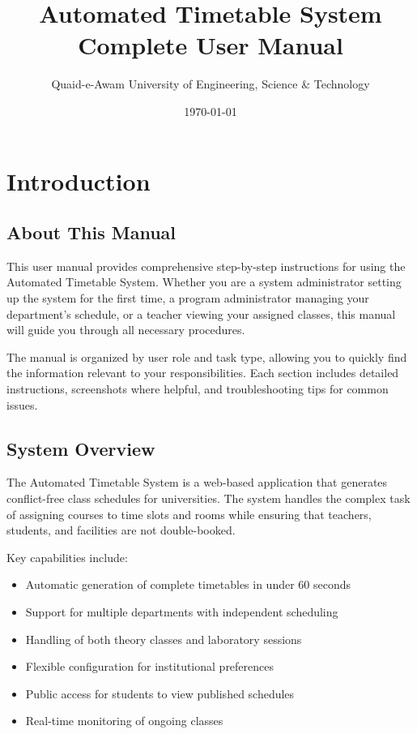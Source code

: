\documentclass[12pt,a4paper]{article}
\title{\textbf{Automated Timetable System}\\
\large Complete User Manual}
\author{Quaid-e-Awam University of Engineering, Science \& Technology}
\date{\today}
\begin{document}
\maketitle
\tableofcontents
\newpage

\section{Introduction}

\subsection{About This Manual}

This user manual provides comprehensive step-by-step instructions for using the Automated Timetable System. Whether you are a system administrator setting up the system for the first time, a program administrator managing your department's schedule, or a teacher viewing your assigned classes, this manual will guide you through all necessary procedures.

The manual is organized by user role and task type, allowing you to quickly find the information relevant to your responsibilities. Each section includes detailed instructions, screenshots where helpful, and troubleshooting tips for common issues.

\subsection{System Overview}

The Automated Timetable System is a web-based application that generates conflict-free class schedules for universities. The system handles the complex task of assigning courses to time slots and rooms while ensuring that teachers, students, and facilities are not double-booked.

Key capabilities include:
\begin{itemize}
\item Automatic generation of complete timetables in under 60 seconds
\item Support for multiple departments with independent scheduling
\item Handling of both theory classes and laboratory sessions
\item Flexible configuration for institutional preferences
\item Public access for students to view published schedules
\item Real-time monitoring of ongoing classes
\end{itemize}
\end{document}
